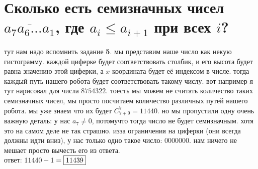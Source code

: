 \documentclass{article}
\newcommand{\Cnk}[2]{C_{#1}^{#2}}
\begin{document}
  \section{Сколько есть семизначных чисел $\overline{a_7a_6 \dots a_1}$, где $a_i \leq a_{i+1}$ при всех $i$?}
  \begin{wrapfigure}{r}{4.3cm}
    \vspace{-.5cm}
    \hfill
  \end{wrapfigure}
  тут нам надо вспомнить задание \textbf{5}. мы представим наше число как некую гистограмму.
  каждой циферке будет соответствовать столбик, и его высота будет равна значению этой циферки, а $x$ координата будет её индексом в числе.
  тогда каждый путь нашего робота будет соответствовать такому числу. вот например я тут нарисовал для числа $8754322$.
  тоесть мы можем не считать количество таких семизначных чисел, мы просто посчитаем количество различных путей нашего робота.
  мы уже знаем что их будет $\Cnk{7+9}{7} = 11440$.
  но мы пропустили одну очень важную деталь: у нас $a_7 \neq 0$, потомучто тогда число не будет семизначным.
  хотя это на самом деле не так страшно. изза ограничения на циферки (они всегда должны идти вниз), у нас только одно такое число: $0000000$.
  нам ничего не мешает просто вычесть его из ответа. \\
  ответ: $11440 - 1 = \fbox{11439}$
\end{document}
